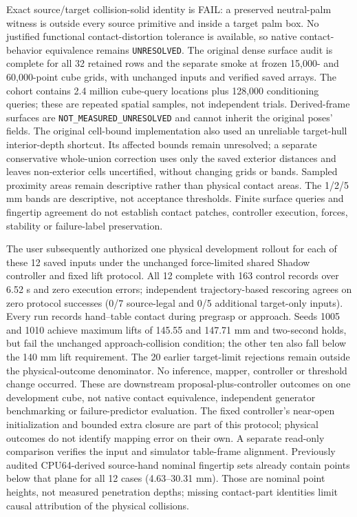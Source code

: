 \documentclass[10pt,letterpaper]{article}
\begin{document}
Exact source/target collision-solid identity is FAIL: a preserved neutral-palm
witness is outside every source primitive and inside a target palm box. No
justified functional contact-distortion tolerance is available, so native
contact-behavior equivalence remains \texttt{UNRESOLVED}. The original dense surface
audit is complete for all 32 retained rows and the separate smoke at frozen
15,000- and 60,000-point cube grids, with unchanged inputs and verified saved
arrays. The cohort contains 2.4 million cube-query locations plus 128,000
conditioning queries; these are repeated spatial samples, not independent trials. Derived-frame surfaces are
\texttt{NOT\_MEASURED\_UNRESOLVED} and cannot inherit the original poses' fields.
The original cell-bound implementation also used an unreliable target-hull
interior-depth shortcut. Its affected bounds remain unresolved; a separate
conservative whole-union correction uses only the saved exterior distances
and leaves non-exterior cells uncertified, without changing grids or bands.
Sampled proximity areas remain descriptive rather than physical contact areas.
The 1/2/5 mm bands are descriptive, not acceptance thresholds. Finite surface
queries and fingertip agreement do not establish contact patches, controller
execution, forces, stability or failure-label preservation.

The user subsequently authorized one physical development rollout for each of
these 12 saved inputs under the unchanged force-limited shared Shadow controller
and fixed lift protocol. All 12 complete with 163 control records over 6.52 s
and zero execution errors; independent trajectory-based rescoring agrees on
zero protocol successes (0/7 source-legal and 0/5 additional target-only inputs).
Every run records hand--table contact during pregrasp or approach. Seeds 1005
and 1010 achieve maximum lifts of 145.55 and 147.71 mm and two-second holds,
but fail the unchanged approach-collision condition; the other ten also fall
below the 140 mm lift requirement. The 20 earlier target-limit rejections remain
outside the physical-outcome denominator. No inference, mapper, controller or
threshold change occurred. These are downstream proposal-plus-controller
outcomes on one development cube, not native contact equivalence, independent
generator benchmarking or failure-predictor evaluation. The fixed controller's
near-open initialization and bounded extra closure are part of this protocol;
physical outcomes do not identify mapping error on their own.
A separate read-only comparison verifies the input and simulator table-frame
alignment. Previously audited CPU64-derived source-hand nominal fingertip sets
already contain points below that plane for all 12 cases (4.63--30.31 mm).
Those are nominal point heights, not measured penetration depths; missing
contact-part identities limit causal attribution of the physical collisions.
\end{document}
